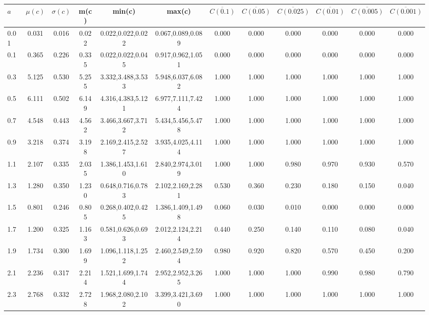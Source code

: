 \begin{table*}[h!]
\begin{center}
\begin{tabular}{| l | c | c | c | c | c | c | c | c | c | c | c |}\hline
$a$ & $\mu(c)$ & $\sigma(c)$ & m(c) & min(c) & max(c) & $\overline{C(0.1)}$ & $\overline{C(0.05)}$ & $\overline{C(0.025)}$ & $\overline{C(0.01)}$ & $\overline{C(0.005)}$ & $\overline{C(0.001)}$ \\\hline
0.01 & 0.031 & 0.016 & 0.022 & 0.022,0.022,0.022 & 0.067,0.089,0.089  & 0.000  & 0.000  & 0.000  & 0.000  & 0.000  & 0.000 \\\hline
0.1 & 0.365 & 0.226 & 0.335 & 0.022,0.022,0.045 & 0.917,0.962,1.051  & 0.000  & 0.000  & 0.000  & 0.000  & 0.000  & 0.000 \\\hline
0.3 & 5.125 & 0.530 & 5.255 & 3.332,3.488,3.533 & 5.948,6.037,6.082  & 1.000  & 1.000  & 1.000  & 1.000  & 1.000  & 1.000 \\\hline
0.5 & 6.111 & 0.502 & 6.149 & 4.316,4.383,5.121 & 6.977,7.111,7.424  & 1.000  & 1.000  & 1.000  & 1.000  & 1.000  & 1.000 \\\hline
0.7 & 4.548 & 0.443 & 4.562 & 3.466,3.667,3.712 & 5.434,5.456,5.478  & 1.000  & 1.000  & 1.000  & 1.000  & 1.000  & 1.000 \\\hline
0.9 & 3.218 & 0.374 & 3.198 & 2.169,2.415,2.527 & 3.935,4.025,4.114  & 1.000  & 1.000  & 1.000  & 1.000  & 1.000  & 1.000 \\\hline
1.1 & 2.107 & 0.335 & 2.035 & 1.386,1.453,1.610 & 2.840,2.974,3.019  & 1.000  & 1.000  & 0.980  & 0.970  & 0.930  & 0.570 \\\hline
1.3 & 1.280 & 0.350 & 1.230 & 0.648,0.716,0.783 & 2.102,2.169,2.281  & 0.530  & 0.360  & 0.230  & 0.180  & 0.150  & 0.040 \\\hline
1.5 & 0.801 & 0.246 & 0.805 & 0.268,0.402,0.425 & 1.386,1.409,1.498  & 0.060  & 0.030  & 0.010  & 0.000  & 0.000  & 0.000 \\\hline
1.7 & 1.200 & 0.325 & 1.163 & 0.581,0.626,0.693 & 2.012,2.124,2.214  & 0.440  & 0.250  & 0.140  & 0.110  & 0.080  & 0.040 \\\hline
1.9 & 1.734 & 0.300 & 1.699 & 1.096,1.118,1.252 & 2.460,2.549,2.594  & 0.980  & 0.920  & 0.820  & 0.570  & 0.450  & 0.200 \\\hline
2.1 & 2.236 & 0.317 & 2.214 & 1.521,1.699,1.744 & 2.952,2.952,3.265  & 1.000  & 1.000  & 1.000  & 0.990  & 0.980  & 0.790 \\\hline
2.3 & 2.768 & 0.332 & 2.728 & 1.968,2.080,2.102 & 3.399,3.421,3.690  & 1.000  & 1.000  & 1.000  & 1.000  & 1.000  & 1.000 \\\hline

\end{tabular}
\end{center}
\end{table*}
